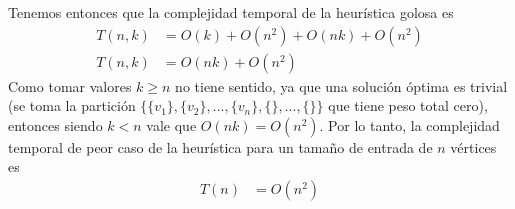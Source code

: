 Tenemos entonces que la complejidad temporal de la heurística golosa es
\begin{align*}
    T(n,k) &= O(k) + O(n^2) + O(nk) + O(n^2) \\
    T(n,k) &= O(nk) + O(n^2)
\end{align*}
Como tomar valores $k \geq n$ no tiene sentido, ya que una solución óptima es trivial (se toma la partición $\{\{v_1\}, \{v_2\}, ..., \{v_n\}, \{\}, ..., \{\}\}$ que tiene peso total cero), entonces siendo $k < n$ vale que $O(nk) = O(n^2)$. Por lo tanto, la complejidad temporal de peor caso de la heurística para un tamaño de entrada de $n$ vértices es
\begin{align*}
    T(n) &= O(n^2)
\end{align*}
